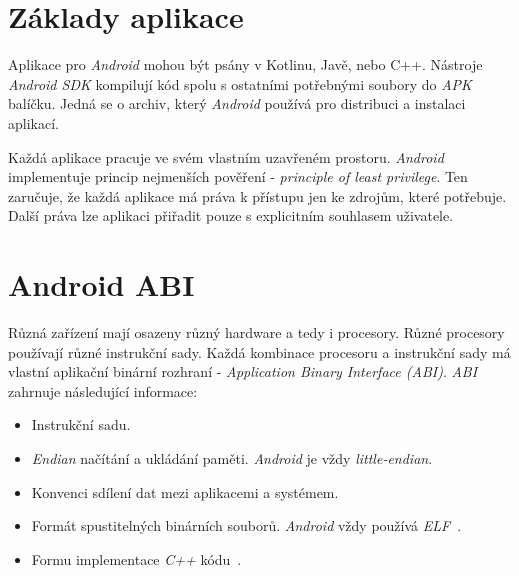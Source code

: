 \section{Základy aplikace}
Aplikace pro \emph{Android} mohou být psány v Kotlinu, Javě, nebo C++. Nástroje \emph{Android SDK} kompilují kód spolu s ostatními potřebnými soubory do \emph{APK}~ balíčku. Jedná se o archiv, který \emph{Android} používá pro distribuci a instalaci aplikací.

Každá aplikace pracuje ve svém vlastním uzavřeném prostoru. \emph{Android} implementuje princip nejmenších pověření - \emph{principle of least privilege}. Ten zaručuje, že každá aplikace má práva k přístupu jen ke zdrojům, které potřebuje. Další práva lze aplikaci přiřadit pouze s explicitním souhlasem uživatele.

\section{Android ABI}\label{sec:zaklady_abi}
Různá zařízení mají osazeny různý hardware a tedy i procesory. Různé procesory používají různé instrukční sady. Každá kombinace procesoru a instrukční sady má vlastní aplikační binární rozhraní - \emph{Application Binary Interface (ABI)}. \emph{ABI}~ zahrnuje následující informace:
\begin{itemize}
    \item Instrukční sadu.
    \item \emph{Endian} načítání a ukládání paměti. \emph{Android} je vždy \emph{little-endian}.
    \item Konvenci sdílení dat mezi aplikacemi a systémem.
    \item Formát spustitelných binárních souborů. \emph{Android} vždy používá \emph{ELF}~.
    \item Formu implementace \emph{C++} kódu~.
\end{itemize}

